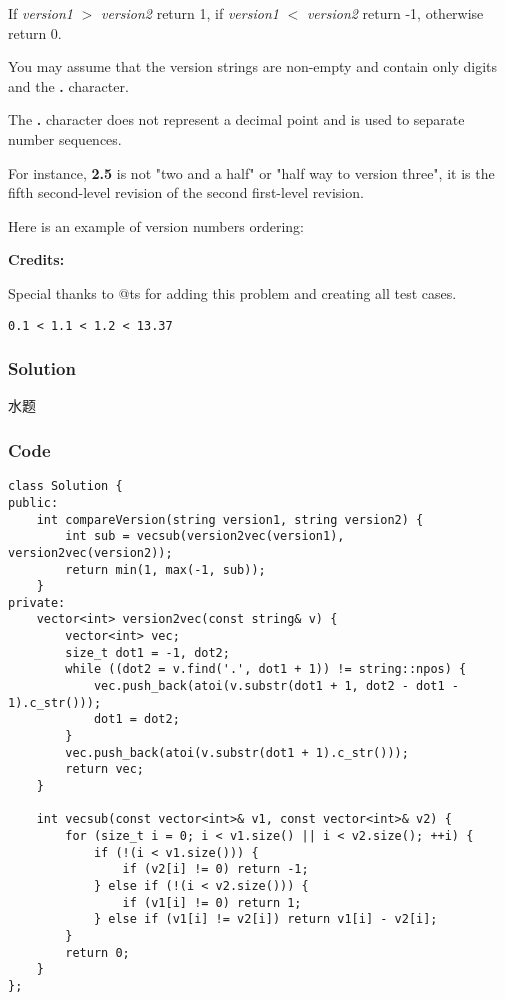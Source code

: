 \documentclass[courier]{article}
\begin{document}
\begin{CJK*}{UTF8}{gkai}
If \emph{version1} $>$ \emph{version2} return 1, if \emph{version1} $<$ \emph{version2} return -1, otherwise return 0.

You may assume that the version strings are non-empty and contain only digits and the \textbf{.} character.


The \textbf{.} character does not represent a decimal point and is used to separate number sequences.


For instance, \textbf{2.5} is not "two and a half" or "half way to version three", it is the fifth second-level revision of the second first-level revision.

Here is an example of version numbers ordering:

\textbf{Credits:}

Special thanks to @ts for adding this problem and creating all test cases.

\begin{verbatim}
0.1 < 1.1 < 1.2 < 13.37
\end{verbatim}


\subsubsection*{Solution}
水题

\subsubsection*{Code}
\begin{lstlisting}
class Solution {
public:
    int compareVersion(string version1, string version2) {
        int sub = vecsub(version2vec(version1), version2vec(version2));
        return min(1, max(-1, sub));
    }
private:
    vector<int> version2vec(const string& v) {
        vector<int> vec;
        size_t dot1 = -1, dot2;
        while ((dot2 = v.find('.', dot1 + 1)) != string::npos) {
            vec.push_back(atoi(v.substr(dot1 + 1, dot2 - dot1 - 1).c_str()));
            dot1 = dot2;
        }
        vec.push_back(atoi(v.substr(dot1 + 1).c_str()));
        return vec;
    }
    
    int vecsub(const vector<int>& v1, const vector<int>& v2) {
        for (size_t i = 0; i < v1.size() || i < v2.size(); ++i) {
            if (!(i < v1.size())) {
                if (v2[i] != 0) return -1;
            } else if (!(i < v2.size())) {
                if (v1[i] != 0) return 1;
            } else if (v1[i] != v2[i]) return v1[i] - v2[i];
        }
        return 0;
    }
}; 
\end{lstlisting}



\end{CJK*}
\end{document}
